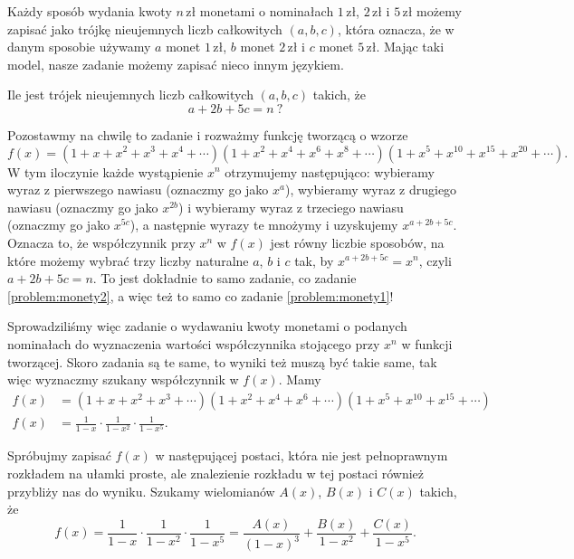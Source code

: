 \documentclass[shortabstract]{imthesis}
\begin{document}
    Każdy sposób wydania kwoty $n\,\text{zł}$ monetami o nominałach $1\,\text{zł}$, $2\,\text{zł}$ i $5\,\text{zł}$ możemy zapisać jako trójkę nieujemnych liczb całkowitych $(a, b, c)$, która oznacza, że w danym sposobie używamy $a$ monet $1\,\text{zł}$, $b$ monet $2\,\text{zł}$ i $c$ monet $5\,\text{zł}$. Mając taki model, nasze zadanie możemy zapisać nieco innym językiem.

    \begin{problem} \label{problem:monety2}
        Ile jest trójek nieujemnych liczb całkowitych $(a, b, c)$ takich, że
        $$
        a + 2b + 5c = n\ ?
        $$
    \end{problem}

    Pozostawmy na chwilę to zadanie i rozważmy funkcję tworzącą o wzorze
    $$
    f(x) = (1+x+x^2+x^3+x^4+\cdots)(1+x^2+x^4+x^6+x^8+\cdots)(1+x^{5}+x^{10}+x^{15}+x^{20}+\cdots).
    $$
    W tym iloczynie każde wystąpienie $x^n$ otrzymujemy następująco: wybieramy wyraz z pierwszego nawiasu (oznaczmy go jako $x^a$), wybieramy wyraz z drugiego nawiasu (oznaczmy go jako $x^{2b}$) i wybieramy wyraz z trzeciego nawiasu (oznaczmy go jako $x^{5c}$), a następnie wyrazy te mnożymy i uzyskujemy $x^{a+2b+5c}$. Oznacza to, że współczynnik przy $x^n$ w $f(x)$ jest równy liczbie sposobów, na które możemy wybrać trzy liczby naturalne $a$, $b$ i $c$ tak, by $x^{a+2b+5c} = x^n$, czyli $a+2b+5c = n$. To jest dokładnie to samo zadanie, co zadanie \ref{problem:monety2}, a więc też to samo co zadanie \ref{problem:monety1}!

    Sprowadziliśmy więc zadanie o wydawaniu kwoty monetami o podanych nominałach do wyznaczenia wartości współczynnika stojącego przy $x^n$ w funkcji tworzącej. Skoro zadania są te same, to wyniki też muszą być takie same, tak więc wyznaczmy szukany współczynnik w $f(x)$. Mamy
    \begin{align*}
        f(x) &= (1+x+x^2+x^3+\cdots)(1+x^2+x^4+x^6+\cdots)(1+x^{5}+x^{10}+x^{15}+\cdots) \\
        f(x) &= \frac{1}{1-x} \cdot \frac{1}{1-x^2} \cdot \frac{1}{1-x^5}.
    \end{align*}

    Spróbujmy zapisać $f(x)$ w następującej postaci, która nie jest pełnoprawnym rozkładem na ułamki proste, ale znalezienie rozkładu w tej postaci również przybliży nas do wyniku. Szukamy wielomianów $A(x)$, $B(x)$ i $C(x)$ takich, że
    $$
    f(x) = \frac{1}{1-x} \cdot \frac{1}{1-x^2} \cdot \frac{1}{1-x^5} = \frac{A(x)}{(1-x)^3} + \frac{B(x)}{1-x^2} + \frac{C(x)}{1-x^5}.
    $$
\end{document}
